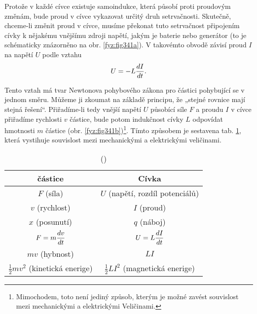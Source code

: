   Protože v každé cívce existuje samoindukce, která působí proti proudovým změnám, bude proud v 
  cívce vykazovat určitý druh setrvačnosti. Skutečně, chceme-li změnit proud v cívce, musíme 
  překonat tuto setrvačnost připojením cívky k nějakému vnějšímu zdroji napětí, jakým je baterie 
  nebo generátor (to je schématicky znázorněno na obr. \ref{fyz:fig341a}). V takovémto obvodě 
  závisí proud \(I\) na napětí \(U\) podle vztahu
  \begin{equation}\label{fyz:eq419}
    U = - L\dfrac{d I}{d t}.
  \end{equation}
  
  Tento vztah má tvar Newtonova pohybového zákona pro částici pohybující se v jednom směru. Můžeme 
  ji zkoumat na základě principu, že „stejné rovnice mají stejná řešení“. Přiřadíme-li tedy vnější 
  napětí \(U\) působící síle \(F\) a proudu \(I\) v cívce přiřadíme rychlosti \(v\) částice, bude 
  potom indukčnost cívky \(L\) odpovídat hmotnosti \(m\) částice (obr. 
  \ref{fyz:fig341b})\footnote{Mimochodem, toto není jediný způsob, kterým je možné zavést 
  souvislost mezi mechanickými a elektrickými Veličinami.}. Tímto způsobem je sestavena tab. 
  \ref{fyz:tab009}, která vystihuje souvislost mezi mechanickými a elektrickými veličinami.

  \begin{table}[ht!] %
    \centering
    \renewcommand{\arraystretch}{1.4}
    \begin{tabular}{c|c}
           \hline \textbf{částice}  & \textbf{Cívka}                            \\ \hline
                       \(F\) (síla) & \(U\) (napětí, rozdíl potenciálů)         \\
                \(v\) (rychlost)    & \(I\) (proud)                             \\
                \(x\) (posunutí)    & \(q\) (náboj)                             \\
                \(F = m\dfrac{d v}{d t}\) & \(U = L\dfrac{d I}{d t}\)                       \\
                \(mv\) (hybnost)    & \(LI\)                                    \\
       \(\frac{1}{2}mv^2\) (kinetická enerige) & \(\frac{1}{2}LI^2\) (magnetická enerige)     \\
       \hline 
    \end{tabular}
    \caption{(\cite[s.~308]{Feynman01})}
    \label{fyz:tab009}
  \end{table}
    
